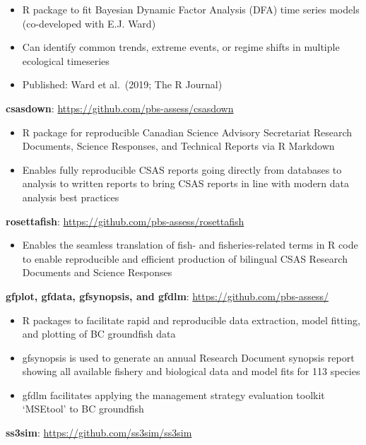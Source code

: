 \begin{itemize}
\tightlist
\item
  R package to fit Bayesian Dynamic Factor Analysis (DFA) time series
  models (co-developed with E.J. Ward)
\item
  Can identify common trends, extreme events, or regime shifts in
  multiple ecological timeseries
\item
  Published: Ward et al.\ (2019; The R Journal)
\end{itemize}

\textbf{csasdown}: \url{https://github.com/pbs-assess/csasdown}

\begin{itemize}
\tightlist
\item
  R package for reproducible Canadian Science Advisory Secretariat
  Research Documents, Science Responses, and Technical Reports via R
  Markdown
\item
  Enables fully reproducible CSAS reports going directly from databases
  to analysis to written reports to bring CSAS reports in line with
  modern data analysis best practices
\end{itemize}

\textbf{rosettafish}: \url{https://github.com/pbs-assess/rosettafish}

\begin{itemize}
\tightlist
\item
  Enables the seamless translation of fish- and fisheries-related terms
  in R code to enable reproducible and efficient production of bilingual
  CSAS Research Documents and Science Responses
\end{itemize}

\textbf{gfplot, gfdata, gfsynopsis, and gfdlm}:
\url{https://github.com/pbs-assess/}

\begin{itemize}
\tightlist
\item
  R packages to facilitate rapid and reproducible data extraction, model
  fitting, and plotting of BC groundfish data
\item
  gfsynopsis is used to generate an annual Research Document synopsis
  report showing all available fishery and biological data and model
  fits for 113 species
\item
  gfdlm facilitates applying the management strategy evaluation toolkit
  `MSEtool' to BC groundfish
\end{itemize}

\textbf{ss3sim}: \url{https://github.com/ss3sim/ss3sim}

